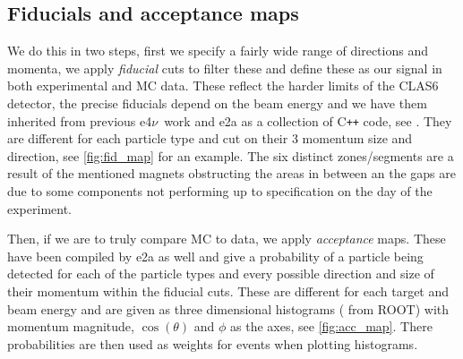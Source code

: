 \documentclass[a4paper,12pt]{article}
\newcommand{\efn}{e4$\nu$}
\newcommand{\verbb}[1]{\text{\Verb|#1|}}
\begin{document}
\subsection{Fiducials and acceptance maps}
We do this in two steps, first we specify a fairly wide range of directions and momenta, we apply \emph{fiducial} cuts to filter these and define these as our signal in both experimental and MC data.
These reflect the harder limits of the CLAS6 detector, the precise fiducials depend on the beam energy and we have them inherited from previous \efn\ work and e2a as a collection of C\texttt{++} code, see \cite{papadopoulouLeptonNucleusScatteringMeasurements2023,mclauchlanDeltaElectroproduction12C}.
They are different for each particle type and cut on their 3 momentum size and direction, see \cref{fig:fid_map} for an example.
The six distinct zones/segments are a result of the mentioned magnets obstructing the areas in between an the gaps are due to some components not performing up to specification on the day of the experiment.

Then, if we are to truly compare MC to data, we apply \emph{acceptance} maps.
These have been compiled by e2a as well and give a probability of a particle being detected for each of the particle types and every possible direction and size of their momentum within the fiducial cuts.
These are different for each target and beam energy and are given as three dimensional histograms (\verbb{TH3F} from ROOT) with momentum magnitude, $\cos(\theta)$ and $\phi$ as the axes, see \cref{fig:acc_map}.
There probabilities are then used as weights for events when plotting histograms.
\end{document}
